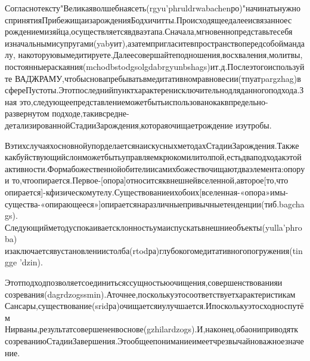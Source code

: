 Согласнотексту"Великаяволшебнаясеть(rgyu'phruldrwabachenро)"начинатьнужно
спринятияПрибежищаизарожденияБодхичитты.Происходящеедалееисвязанноес
рождениемизяйца,осуществляетсявдваэтапа.Сначала,мгновеннопредставьтесебя
изначальнымисупругами(yabуит),азатемпригласитевпространствопередсобоймандалу,
накоторуювымедитируете.Далеесовершайтеподношения,восхваления,молитвы,
постоянныераскаяния(mchodbstodgsolgdabrgyunbshags)ит.д.Послеэтогоиспользуйте
ВАДЖРАМУ,чтобысновапребыватьвмедитативномравновесии(тпуатpargzhag)в
сфереПустоты.Этотпоследнийпунктхарактеренисключительнодляданногоподхода.Зная
это,следующеепредставлениеможетбытьиспользованокаквпредельно-развернутом
подходе,такивсредне-детализированнойСтадииЗарождения,котораяочищаетрождение
изутробы.

ВэтихслучаяхосновнойупорделаетсянаискусныхметодахСтадииЗарождения.Также
какбуйствующийслонможетбытьуправляемкрюкомилитолпой,естьдваподходакэтой
активности.Формабожественнойобителиисамихбожествочищаютдваэлемента:опоруи
то,чтоопирается.Первое-[опора]относитсяквнешнейвселенной,авторое[то,что
опирается]-кфизическомутелу.Существованиеихобоих[вселенная-«опора»имы-
существа-«опирающееся»]опираетсянаразличныепривычныетенденции(тиб.bagchags).
Следующийметодуспокаиваетсклонностьумаиспускатьвнешниеобъекты(yulla'phroba)
изаключаетсявустановлениистолба(rtodра)глубокогомедитативногопогружения(tingge
'dzin).

Этотподходпозволяетсоединитьсяссущностьюочищения,совершенствованияи
созревания(dagrdzogssmin).Аточнее,посколькуэтосоответствуетхарактеристикам
Сансары,существование(sridра)очищаетсяиулучшается.Ипосколькуэтосходноспутём
Нирваны,результатсовершененвоснове(gzhilardzogs).И,наконец,обаониприводятк
созреваниюСтадииЗавершения.Этообщеепониманиеимеетчрезвычайноважноезначение.

